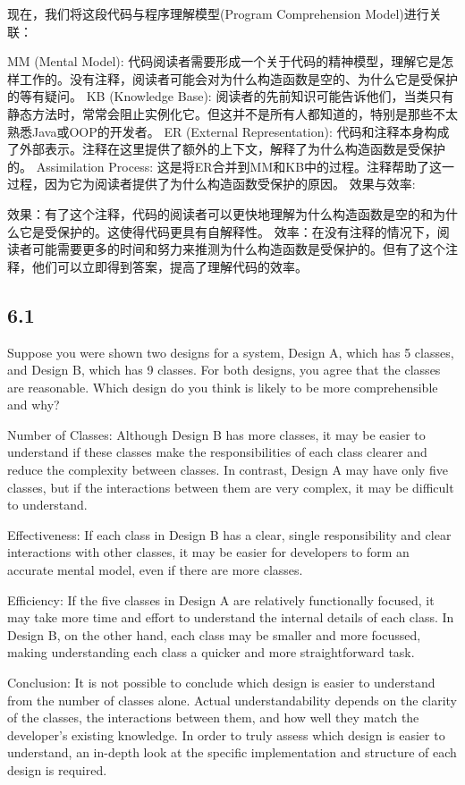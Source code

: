 现在，我们将这段代码与程序理解模型(Program Comprehension Model)进行关联：

MM (Mental Model): 代码阅读者需要形成一个关于代码的精神模型，理解它是怎样工作的。没有注释，阅读者可能会对为什么构造函数是空的、为什么它是受保护的等有疑问。
KB (Knowledge Base): 阅读者的先前知识可能告诉他们，当类只有静态方法时，常常会阻止实例化它。但这并不是所有人都知道的，特别是那些不太熟悉Java或OOP的开发者。
ER (External Representation): 代码和注释本身构成了外部表示。注释在这里提供了额外的上下文，解释了为什么构造函数是受保护的。
Assimilation Process: 这是将ER合并到MM和KB中的过程。注释帮助了这一过程，因为它为阅读者提供了为什么构造函数受保护的原因。
效果与效率:

效果：有了这个注释，代码的阅读者可以更快地理解为什么构造函数是空的和为什么它是受保护的。这使得代码更具有自解释性。
效率：在没有注释的情况下，阅读者可能需要更多的时间和努力来推测为什么构造函数是受保护的。但有了这个注释，他们可以立即得到答案，提高了理解代码的效率。

\subsection{6.1}
Suppose you were shown two designs for a system, Design A, which has 5 classes, and Design B, which has 9 classes. For both designs, you agree that the classes are reasonable. Which design do you think is likely to be more comprehensible and why?

Number of Classes: Although Design B has more classes, it may be easier to understand if these classes make the responsibilities of each class clearer and reduce the complexity between classes. In contrast, Design A may have only five classes, but if the interactions between them are very complex, it may be difficult to understand.

Effectiveness: If each class in Design B has a clear, single responsibility and clear interactions with other classes, it may be easier for developers to form an accurate mental model, even if there are more classes.

Efficiency: If the five classes in Design A are relatively functionally focused, it may take more time and effort to understand the internal details of each class. In Design B, on the other hand, each class may be smaller and more focussed, making understanding each class a quicker and more straightforward task.

Conclusion: It is not possible to conclude which design is easier to understand from the number of classes alone. Actual understandability depends on the clarity of the classes, the interactions between them, and how well they match the developer's existing knowledge. In order to truly assess which design is easier to understand, an in-depth look at the specific implementation and structure of each design is required.

